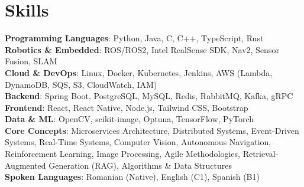 \documentclass[letterpaper,11pt]{article}
\begin{document}
\section{Skills}
\begin{itemize}[leftmargin=0.15in, label={}]
	\small{\item{
		      \textbf{Programming Languages}{: Python, Java, C, C++, TypeScript, Rust} \\
		      \textbf{Robotics \& Embedded}{: ROS/ROS2, Intel RealSense SDK, Nav2, Sensor Fusion, SLAM} \\
		      \textbf{Cloud \& DevOps}{: Linux, Docker, Kubernetes, Jenkins, AWS (Lambda, DynamoDB, SQS, S3, CloudWatch, IAM)} \\
		      \textbf{Backend}{: Spring Boot, PostgreSQL, MySQL, Redis, RabbitMQ, Kafka, gRPC} \\
		      \textbf{Frontend}{: React, React Native, Node.js, Tailwind CSS, Bootstrap} \\
		      \textbf{Data \& ML}{: OpenCV, scikit-image, Optuna, TensorFlow, PyTorch} \\
			  \textbf{Core Concepts}{: Microservices Architecture, Distributed Systems, Event-Driven Systems, Real-Time Systems, Computer Vision, Autonomous Navigation, Reinforcement Learning, Image Processing, Agile Methodologies, Retrieval-Augmented Generation (RAG), Algorithms \& Data Structures} \\
		      \textbf{Spoken Languages}{: Romanian (Native), English (C1), Spanish (B1)}
	      }}
\end{itemize}
\end{document}
